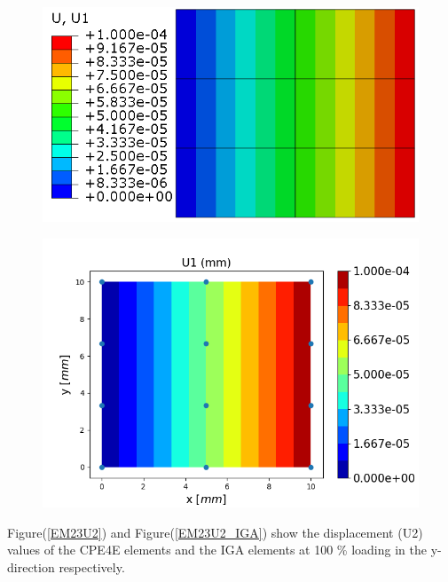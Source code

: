 \documentclass[11pt]{article}
\begin{document}
\begin{figure}[H]
	\centering
	\begin{minipage}{.5\textwidth}
		\centering
		\includegraphics[width=1\linewidth]{EM23U1.png}
		\label{EM23U1}
	\end{minipage}%
	\begin{minipage}{.6\textwidth}
		\centering
		\includegraphics[width=1\linewidth]{EM23U1_IGA.png}
		\label{EM23U1_IGA}
	\end{minipage}
\end{figure}
\noindent
Figure(\ref{EM23U2}) and Figure(\ref{EM23U2_IGA}) show the displacement (U2) values of the CPE4E elements and the IGA elements at 100 \% loading in the y-direction respectively. \\
\end{document}
